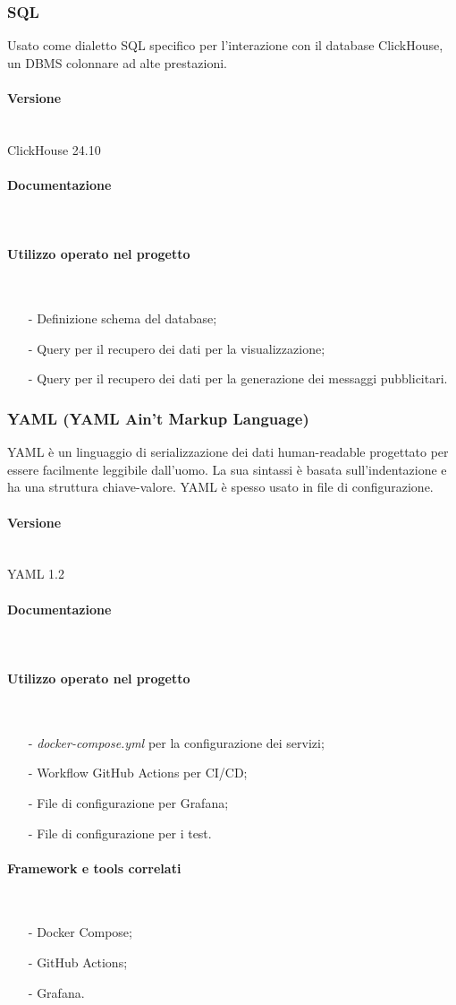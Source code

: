 \documentclass[10pt]{article}
\newcommand{\myparagraph}[1]{\paragraph{#1}\mbox{}\\\vspace{0.4em}}
\begin{document}
\begin{justify}
        \subsubsection{SQL}
        Usato come dialetto SQL specifico per l'interazione con il database ClickHouse, un DBMS colonnare ad alte prestazioni.
            \myparagraph{Versione}
                ClickHouse 24.10
            \myparagraph{Documentazione}
            \myparagraph{Utilizzo operato nel progetto}
                \begin{itemize}
                    \item[-] Definizione schema del database;
                    \item[-] Query per il recupero dei dati per la visualizzazione;
                    \item[-] Query per il recupero dei dati per la generazione dei messaggi pubblicitari.
                \end{itemize}

        \subsubsection{YAML (YAML Ain't Markup Language)}
        YAML è un linguaggio di serializzazione dei dati human-readable progettato per essere facilmente leggibile dall'uomo. La sua 
        sintassi è basata sull'indentazione e ha una struttura chiave-valore. YAML è spesso usato in file di configurazione.
            \myparagraph{Versione} 
                YAML 1.2
            \myparagraph{Documentazione}
            \myparagraph{Utilizzo operato nel progetto}
                \begin{itemize}
                    \item[-] \textit{docker-compose.yml} per la configurazione dei servizi;
                    \item[-] Workflow GitHub Actions per CI/CD;
                    \item[-] File di configurazione per Grafana;
                    \item[-] File di configurazione per i test.
                \end{itemize}
            \myparagraph{Framework e tools correlati}
            \begin{itemize}
                \item[-] Docker Compose;
                \item[-] GitHub Actions;
                \item[-] Grafana.
            \end{itemize}


\end{justify}
\end{document}
